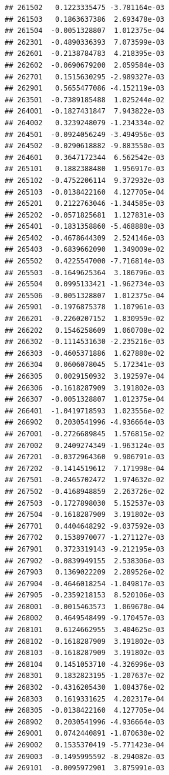 \documentclass[ignorenonframetext,]{beamer}
\begin{document}
\begin{frame}[fragile]
\begin{verbatim}
## 261502   0.1223335475 -3.781164e-03
## 261503   0.1863637386  2.693478e-03
## 261504  -0.0051328807  1.012375e-04
## 262301  -0.4890336393  7.073599e-03
## 262601  -0.2138784783  4.218395e-03
## 262602  -0.0690679200  2.059584e-03
## 262701   0.1515630295 -2.989327e-03
## 262901   0.5655477086 -4.152119e-03
## 263501  -0.7389185488  1.025244e-02
## 264001  -0.1827431847  7.943822e-03
## 264002   0.3239248079 -1.234334e-02
## 264501  -0.0924056249 -3.494956e-03
## 264502  -0.0290618882 -9.883550e-03
## 264601   0.3647172344  6.562542e-03
## 265101   0.1882388480  1.956917e-03
## 265102  -0.4752206114  9.372932e-03
## 265103  -0.0138422160  4.127705e-04
## 265201   0.2122763046 -1.344585e-03
## 265202  -0.0571825681  1.127831e-03
## 265401  -0.1831358860 -5.468880e-03
## 265402  -0.4678644309  2.524146e-03
## 265403  -0.6839662090  1.349009e-02
## 265502   0.4225547000 -7.716814e-03
## 265503  -0.1649625364  3.186796e-03
## 265504   0.0995133421 -1.962734e-03
## 265506  -0.0051328807  1.012375e-04
## 265901  -0.1976875378  1.107961e-03
## 266201  -0.2260207152  1.830959e-02
## 266202   0.1546258609  1.060708e-02
## 266302  -0.1114531630 -2.235216e-03
## 266303  -0.4605371886  1.627880e-02
## 266304   0.0606078045  5.172341e-03
## 266305   0.0029150932  3.192597e-04
## 266306  -0.1618287909  3.191802e-03
## 266307  -0.0051328807  1.012375e-04
## 266401  -1.0419718593  1.023556e-02
## 266902   0.2030541996 -4.936664e-03
## 267001  -0.2726689845  1.576815e-02
## 267002   0.2409274349 -1.963124e-03
## 267201  -0.0372964360  9.906791e-03
## 267202  -0.1414519612  7.171998e-04
## 267501  -0.2465702472  1.974632e-02
## 267502  -0.4168948859  2.263726e-02
## 267503  -0.1727898030  5.152537e-03
## 267504  -0.1618287909  3.191802e-03
## 267701   0.4404648292 -9.037592e-03
## 267702   0.1538970077 -1.271127e-03
## 267901   0.3723319143 -9.212195e-03
## 267902  -0.0839949155  2.538306e-03
## 267903   0.1369022209  2.289526e-02
## 267904  -0.4646018254 -1.049817e-03
## 267905  -0.2359218153  8.520106e-03
## 268001  -0.0015463573  1.069670e-04
## 268002   0.4649548499 -9.170457e-03
## 268101   0.6124662955  3.404625e-03
## 268102  -0.1618287909  3.191802e-03
## 268103  -0.1618287909  3.191802e-03
## 268104   0.1451053710 -4.326996e-03
## 268301   0.1832823195 -1.207637e-02
## 268302  -0.4316205430  1.084376e-02
## 268303   0.1619331625  4.202317e-04
## 268305  -0.0138422160  4.127705e-04
## 268902   0.2030541996 -4.936664e-03
## 269001   0.0742440891 -1.870630e-02
## 269002   0.1535370419 -5.771423e-04
## 269003  -0.1495995592 -8.294082e-03
## 269101  -0.0095972901  3.875991e-03

\end{verbatim}
\end{frame}
\end{document}
